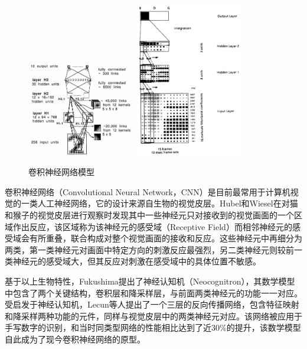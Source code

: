 \begin{figure}[h]
  \centering%
    {\includegraphics[width=0.42\textwidth]{img/lecun1989backpropagation.png}}%
  \hspace{4em}%
      {\includegraphics[width=0.42\textwidth]{img/waibel1995phoneme.png}}
  \caption{卷积神经网络模型}
  \label{fig:cnn}
\end{figure}

卷积神经网络（Convolutional Neural Network，CNN）是目前最常用于计算机视觉的一类人工神经网络，它的设计来源自生物的视觉皮层。Hubel和Wiesel\cite{hubel1959receptive}\cite{hubel1968receptive}在对猫和猴子的视觉皮层进行观察时发现其中一些神经元只对接收到的视觉画面的一个区域作出反应，该区域称为该神经元的感受域（Receptive Field）而相邻神经元的感受域会有所重叠，联合构成对整个视觉画面的接收和反应。这些神经元中再细分为两类，第一类神经元对画面中特定方向的刺激反应最强烈，另二类神经元则较前一类神经元的感受域大，但其反应对刺激在感受域中的具体位置不敏感。

基于以上生物特性，Fukushima\cite{fukushima1980neocognitron}提出了神经认知机（Neocognitron），其数学模型中包含了两个关键结构，卷积层和降采样层，与前面两类神经元的功能一一对应。受启发于神经认知机，Lecun等人\cite{lecun1989backpropagation}提出了一个三层的反向传播网络，包含特征映射和降采样两种功能的元件，同样与视觉皮层中的两类神经元对应。该网络被应用于手写数字的识别，和当时同类型网络的性能相比达到了近30\%的提升，该数学模型自此成为了现今卷积神经网络的原型。

